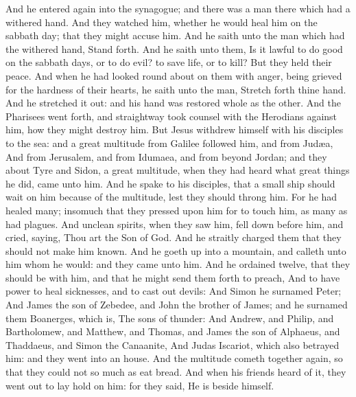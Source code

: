  And he entered again into the synagogue; and there was a
man there which had a withered hand.  And they watched
him, whether he would heal him on the sabbath day; that they might
accuse him.  And he saith unto the man which had the
withered hand, Stand forth.  And he saith unto them, Is it
lawful to do good on the sabbath days, or to do evil? to save life, or
to kill? But they held their peace.  And when he had
looked round about on them with anger, being grieved for the hardness of
their hearts, he saith unto the man, Stretch forth thine hand. And he
stretched it out: and his hand was restored whole as the other.
 And the Pharisees went forth, and straightway took
counsel with the Herodians against him, how they might destroy him.
 But Jesus withdrew himself with his disciples to the sea:
and a great multitude from Galilee followed him, and from Judæa,
 And from Jerusalem, and from Idumaea, and from beyond
Jordan; and they about Tyre and Sidon, a great multitude, when they had
heard what great things he did, came unto him.  And he
spake to his disciples, that a small ship should wait on him because of
the multitude, lest they should throng him.  For he had
healed many; insomuch that they pressed upon him for to touch him, as
many as had plagues.  And unclean spirits, when they saw
him, fell down before him, and cried, saying, Thou art the Son of God.
 And he straitly charged them that they should not make
him known.  And he goeth up into a mountain, and calleth
unto him whom he would: and they came unto him.  And he
ordained twelve, that they should be with him, and that he might send
them forth to preach,  And to have power to heal
sicknesses, and to cast out devils:  And Simon he
surnamed Peter;  And James the son of Zebedee, and John
the brother of James; and he surnamed them Boanerges, which is, The sons
of thunder:  And Andrew, and Philip, and Bartholomew, and
Matthew, and Thomas, and James the son of Alphaeus, and Thaddaeus, and
Simon the Canaanite,  And Judas Iscariot, which also
betrayed him: and they went into an house.  And the
multitude cometh together again, so that they could not so much as eat
bread.  And when his friends heard of it, they went out
to lay hold on him: for they said, He is beside himself.

